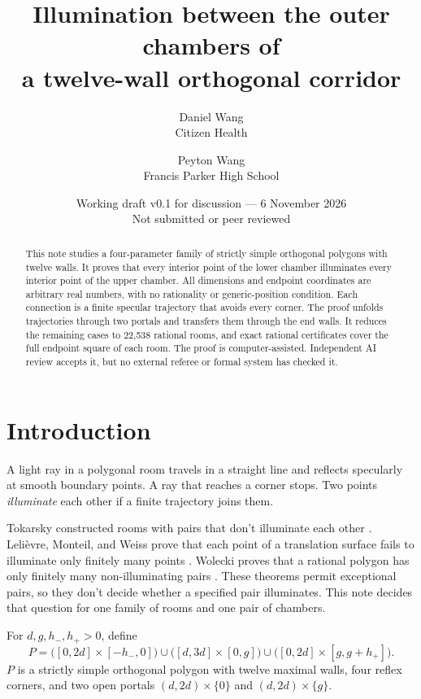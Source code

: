 \documentclass[11pt]{article}
\title{Illumination between the outer chambers of\\a twelve-wall orthogonal corridor}
\author{Daniel Wang\\\small Citizen Health \and Peyton Wang\\\small Francis Parker High School}
\date{Working draft v0.1 for discussion --- 6 November 2026\\\small Not submitted or peer reviewed}
\theoremstyle{remark}
\begin{document}
\maketitle
\vspace{-1.2em}
\begin{abstract}
This note studies a four-parameter family of strictly simple orthogonal polygons with twelve walls.
It proves that every interior point of the lower chamber illuminates every interior point of the upper chamber.
All dimensions and endpoint coordinates are arbitrary real numbers, with no rationality or generic-position condition.
Each connection is a finite specular trajectory that avoids every corner.
The proof unfolds trajectories through two portals and transfers them through the end walls.
It reduces the remaining cases to 22{,}538 rational rooms, and exact rational certificates cover the full endpoint square of each room.
The proof is computer-assisted.
Independent AI review accepts it, but no external referee or formal system has checked it.

\end{abstract}

\section{Introduction}
A light ray in a polygonal room travels in a straight line and reflects specularly at smooth boundary points. A ray that reaches a corner stops. Two points \emph{illuminate} each other if a finite trajectory joins them.

Tokarsky constructed rooms with pairs that don't illuminate each other \cite{Tokarsky1995}. Lelièvre, Monteil, and Weiss prove that each point of a translation surface fails to illuminate only finitely many points \cite[Theorem~2]{LMW2016}. Wolecki proves that a rational polygon has only finitely many non-illuminating pairs \cite[Theorem~1.2(i)]{Wolecki2024}. These theorems permit exceptional pairs, so they don't decide whether a specified pair illuminates. This note decides that question for one family of rooms and one pair of chambers.

For $d,g,h_-,h_+>0$, define
\begin{equation}\label{eq:room}
P=\bigl([0,2d]\times[-h_-,0]\bigr)\cup\bigl([d,3d]\times[0,g]\bigr)\cup\bigl([0,2d]\times[g,g+h_+]\bigr).
\end{equation}
$P$ is a strictly simple orthogonal polygon with twelve maximal walls, four reflex corners, and two open portals $(d,2d)\times\{0\}$ and $(d,2d)\times\{g\}$.
\end{document}
